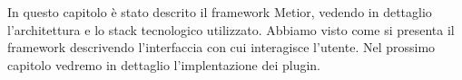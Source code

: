 In questo capitolo è stato descrito il framework Metior, vedendo in dettaglio l'architettura e lo stack tecnologico utilizzato.
Abbiamo visto come si presenta il framework descrivendo l'interfaccia con cui interagisce l'utente.
Nel prossimo capitolo vedremo in dettaglio l'implentazione dei plugin.
